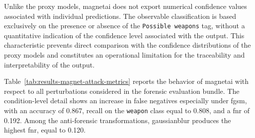 Unlike the proxy models, \gls{magnetai} does not export numerical confidence
values associated with individual predictions. The observable classification is
based exclusively on the presence or absence of the \texttt{Possible weapons}
tag, without a quantitative indication of the confidence level associated with
the output. This characteristic prevents direct comparison with the confidence
distributions of the proxy models and constitutes an operational limitation for
the traceability and interpretability of the output.

Table~\ref{tab:results-magnet-attack-metrics} reports the behavior of
\gls{magnetai} with respect to all perturbations considered in the forensic
evaluation bundle. The condition-level detail shows an increase in false
negatives especially under \gls{fgsm}, with an accuracy of 0.867, recall on the
\texttt{weapon} class equal to 0.808, and a \gls{fnr} of 0.192. Among the
anti-forensic transformations, \gls{gaussianblur} produces the highest
\gls{fnr}, equal to 0.120.

